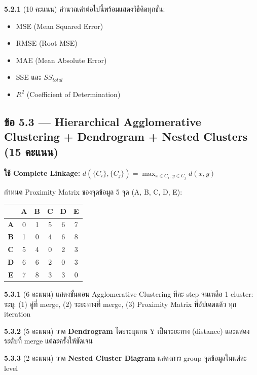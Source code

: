 \documentclass[a4paper,12pt]{article}
\begin{document}
\textbf{5.2.1} (10 คะแนน) คำนวณค่าต่อไปนี้พร้อมแสดงวิธีคิดทุกขั้น:
\begin{itemize}
    \item MSE (Mean Squared Error)
    \item RMSE (Root MSE)
    \item MAE (Mean Absolute Error)
    \item SSE และ $SS_{total}$
    \item $R^2$ (Coefficient of Determination)
\end{itemize}
\vspace{8cm}

\newpage

\subsection*{ข้อ 5.3 — Hierarchical Agglomerative Clustering + Dendrogram + Nested Clusters (15 คะแนน)}
\textbf{ใช้ Complete Linkage:} $d(\{C_i\}, \{C_j\}) = \max_{x \in C_i,\, y \in C_j} d(x,y)$

กำหนด Proximity Matrix ของจุดข้อมูล 5 จุด (A, B, C, D, E):

\begin{center}
\renewcommand{\arraystretch}{1.3}
\begin{tabular}{|c|ccccc|}
    \hline
    \rowcolor{cyan!15}
    & \textbf{A} & \textbf{B} & \textbf{C} & \textbf{D} & \textbf{E} \\
    \hline
    \textbf{A} & 0 & 1 & 5 & 6 & 7 \\
    \textbf{B} & 1 & 0 & 4 & 6 & 8 \\
    \textbf{C} & 5 & 4 & 0 & 2 & 3 \\
    \textbf{D} & 6 & 6 & 2 & 0 & 3 \\
    \textbf{E} & 7 & 8 & 3 & 3 & 0 \\
    \hline
\end{tabular}
\end{center}

\textbf{5.3.1} (6 คะแนน) แสดงขั้นตอน Agglomerative Clustering ทีละ step จนเหลือ 1 cluster:\\
ระบุ: (1) คู่ที่ merge, (2) ระยะทางที่ merge, (3) Proximity Matrix ที่อัปเดตแล้ว ทุก iteration
\vspace{8cm}

\textbf{5.3.2} (5 คะแนน) วาด \textbf{Dendrogram} โดยระบุแกน Y เป็นระยะทาง (distance) และแสดงระดับที่ merge แต่ละครั้งให้ชัดเจน
\vspace{7cm}

\newpage
\textbf{5.3.3} (2 คะแนน) วาด \textbf{Nested Cluster Diagram} แสดงการ group จุดข้อมูลในแต่ละ level
\vspace{12cm}
\end{document}
